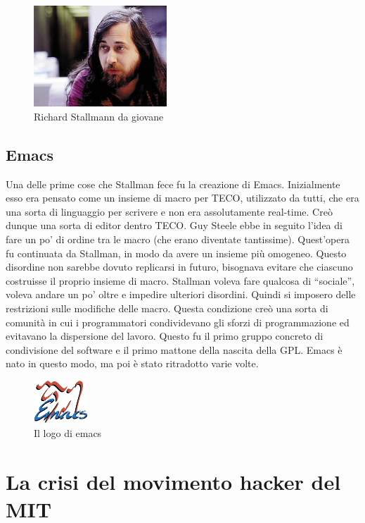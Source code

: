 \begin{figure}[htbp]
	\centering
	\includegraphics[width=50mm]{images/stallman.jpg}
	\caption{Richard Stallmann da giovane}
\end{figure}

\subsection{Emacs}

Una delle prime cose che Stallman fece fu la creazione di Emacs. 
Inizialmente esso era pensato come un insieme di macro per TECO, utilizzato da tutti, che era una sorta di linguaggio per scrivere e non era assolutamente real-time. 
Creò dunque una sorta di editor dentro TECO.  Guy Steele ebbe in seguito l'idea di fare un po' di ordine tra le macro (che erano diventate tantissime). 
Quest'opera fu continuata da Stallman, in modo da avere un insieme più omogeneo. Questo disordine non sarebbe dovuto replicarsi in futuro, bisognava evitare che ciascuno costruisse il proprio insieme di macro. Stallman voleva fare qualcosa di ``sociale'', voleva andare un po' oltre e impedire ulteriori disordini. Quindi si imposero delle restrizioni sulle modifiche delle macro. Questa condizione creò una sorta di comunità in cui i programmatori condividevano gli sforzi di programmazione ed evitavano la dispersione del lavoro. Questo fu il primo gruppo concreto di condivisione del software e il primo mattone della nascita della GPL. Emacs è nato in questo modo, ma poi è stato ritradotto varie volte.

\begin{figure}[htbp]
	\centering
	\includegraphics[width=20mm]{images/emacs.png}
	\caption{Il logo di emacs}
\end{figure}

\section{La crisi del movimento hacker del MIT}

